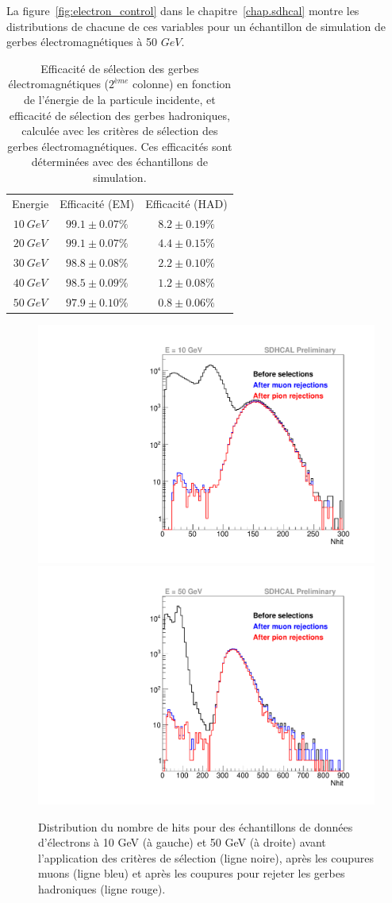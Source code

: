 La figure~\ref{fig:electron_control} dans le chapitre~\ref{chap.sdhcal} montre les distributions de chacune de ces variables pour un échantillon de simulation de gerbes électromagnétiques à 50 $GeV$. 
\begin{table}[!ht]
  \begin{center}
    \begin{tabular}{c|c|c}
      \rowcolor{black!20!white}Energie & Efficacité (EM) & Efficacité (HAD) \\
      \rowcolor{black!5!white}\hline
      \rowcolor{black!5!white}$10~GeV$ & $99.1\pm 0.07\%$ & $8.2\pm 0.19\%$ \\
      \rowcolor{black!5!white}$20~GeV$ & $99.1\pm 0.07\%$ & $4.4\pm 0.15\%$\\
      \rowcolor{black!5!white}$30~GeV$ & $98.8\pm 0.08\%$ & $2.2\pm 0.10\%$\\
      \rowcolor{black!5!white}$40~GeV$ & $98.5\pm 0.09\%$ & $1.2\pm 0.08\%$\\
      \rowcolor{black!5!white}$50~GeV$ & $97.9\pm 0.10\%$ & $0.8\pm 0.06\%$\\
    \end{tabular}
  \end{center}  
  \caption{Efficacité de sélection des gerbes électromagnétiques ($2^{ème}$ colonne) en fonction de l'énergie de la particule incidente, et efficacité de sélection des gerbes hadroniques, calculée avec les critères de sélection des gerbes électromagnétiques. Ces efficacités sont déterminées avec des échantillons de simulation.}
  \label{tab.e_sel_eff}
\end{table}
\begin{figure}[!ht]
  \includegraphics[width=.45\textwidth]{Digitizer/figs/selection715725.pdf}
  \includegraphics[width=.45\textwidth]{Digitizer/figs/selection715716.pdf}
  \caption{Distribution du nombre de hits pour des échantillons de données d'électrons à 10 GeV (à gauche) et 50 GeV (à droite) avant l'application des critères de sélection (ligne noire), après les coupures muons (ligne bleu) et après les coupures pour rejeter les gerbes hadroniques (ligne rouge). \label{fig.e-Selection}}
\end{figure}
